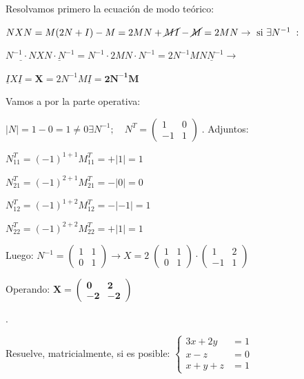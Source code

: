 \begin{proofw}\renewcommand{\qedsymbol}{$\diamond$}
	Resolvamos primero la ecuación de modo teórico:
	
	$NXN=M(2N+I)-M=2MN+\cancel{MI}-\cancel{M}=2MN \to \text{ si } \exists N^{-1}\; :$
	
	$\underline{N^{-1}\cdot N}X\underline{N \cdot N^{-1}}= N^{-1}\cdot 2MN \cdot N^{-1} = 2N^{-1}M\underline{NN^{-1}} \to $
	
	$\underline{I}X\underline{I} = \boldsymbol{X}= 2N^{-1}M\underline{I}=\boldsymbol{2N^{-1}M}$
	
	Vamos a por la parte operativa:
	
	$|N|=1-0=1\neq 0 \exists N^{-1}; \quad N^T=\left( \begin{matrix}  1&0\\-1&1\end{matrix} \right)\; $. Adjuntos:

\begin{multicols}{2}	
\noindent $N^T_{11}=(-1)^{1+1}M^T_{11}=+|1|=1 $

\noindent $N^T_{21}=(-1)^{2+1}M^T_{21}=-|0|=0 $

\noindent $N^T_{12}=(-1)^{1+2}M^T_{12}=-|-1|=1 $

\noindent $N^T_{22}=(-1)^{2+2}M^T_{22}=+|1|=1 $
\end{multicols}

Luego: $N^{-1}=\left( \begin{matrix} 1&1\\0&1 \end{matrix} \right) \to X=2\;\left( \begin{matrix} 1&1\\0&1 \end{matrix} \right)\cdot  \left( \begin{matrix}  1&2\\-1&1\end{matrix} \right)$

Operando:  $\boldsymbol{X=\left( \begin{matrix}  0&2\\-2&-2  \end{matrix} \right)}$

\end{proofw}


\begin{ejre}.

Resuelve, matricialmente, si es posible: 
$\begin{cases}  3x+2y&=1\\x-z&=0\\x+y+z&=1 \end{cases}$
 
\end{ejre}

